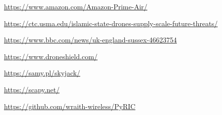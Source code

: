 \documentclass[conference,a4paper]{IEEEtran}
\begin{document}




\begin{thebibliography}{1}
    \url{https://www.amazon.com/Amazon-Prime-Air/}

    \url{https://ctc.usma.edu/islamic-state-drones-supply-scale-future-threats/}

    \url{https://www.bbc.com/news/uk-england-sussex-46623754}

    \url{https://www.droneshield.com/}

    \url{https://samy.pl/skyjack/}

    \url{https://scapy.net/}

    \url{https://github.com/wraith-wireless/PyRIC}

\end{thebibliography}
\end{document}
